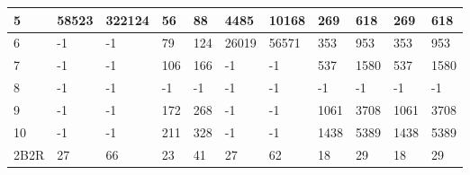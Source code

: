 \begin{table}[H]
\begin{tabular}{l|l|l|l|l|l|l|l|l|l|l|}
\multicolumn{1}{|l|}{5}     & 58523      & 322124     & 56                                  & 88                                   & 4485                                      & 10168                                    & 269                                 & 618                               & 269                                 & 618                               \\ \hline
\multicolumn{1}{|l|}{6}     & -1         & -1         & 79                                  & 124                                  & 26019                                     & 56571                                    & 353                                 & 953                               & 353                                 & 953                               \\ \hline
\multicolumn{1}{|l|}{7}     & -1         & -1         & 106                                 & 166                                  & -1                                        & -1                                       & 537                                 & 1580                              & 537                                 & 1580                              \\ \hline
\multicolumn{1}{|l|}{8}     & -1         & -1         & -1                                  & -1                                   & -1                                        & -1                                       & -1                                  & -1                                & -1                                  & -1                                \\ \hline
\multicolumn{1}{|l|}{9}     & -1         & -1         & 172                                 & 268                                  & -1                                        & -1                                       & 1061                                & 3708                              & 1061                                & 3708                              \\ \hline
\multicolumn{1}{|l|}{10}    & -1         & -1         & 211                                 & 328                                  & -1                                        & -1                                       & 1438                                & 5389                              & 1438                                & 5389                              \\ \hline
\multicolumn{1}{|l|}{2B2R}  & 27         & 66         & 23                                  & 41                                   & 27                                        & 62                                       & 18                                  & 29                                & 18                                  & 29                                \\ \hline

\end{tabular}
\end{table}
